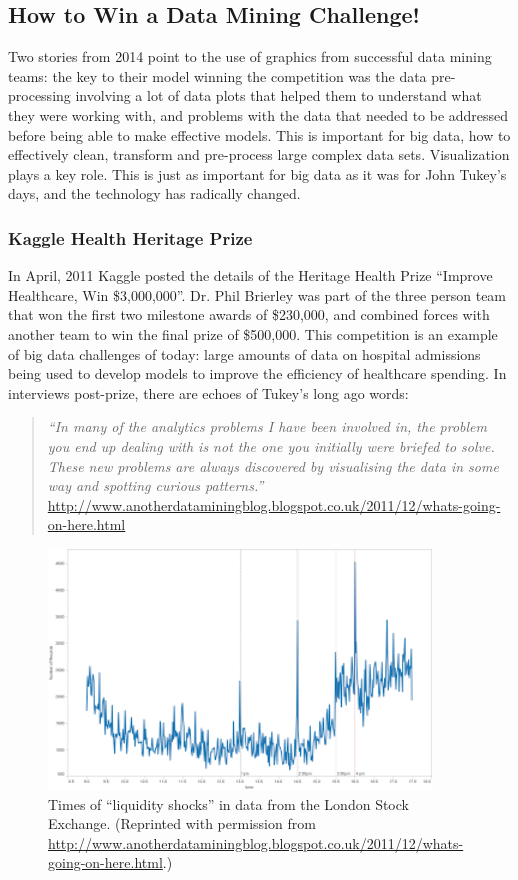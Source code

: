 \documentclass{article}
\begin{document}
\subsection{How to Win a Data Mining Challenge!}

Two stories from 2014 point to the use of graphics from successful data mining teams: the key to their model winning the competition was the data pre-processing involving a lot of data plots that helped them to understand what they were working with, and problems with the data that needed to be addressed before being able to make effective models. This is important for big data, how to effectively clean, transform and pre-process large complex data sets. Visualization plays a key role. This is just as important for big data as it was for John Tukey's days, and the technology has radically changed.

\subsubsection{Kaggle Health Heritage Prize}

In April, 2011 Kaggle posted the details of the Heritage Health Prize ``Improve Healthcare, Win \$3,000,000''.  Dr. Phil Brierley was part of the three person team that won the first two milestone awards of \$230,000, and combined forces with another team to win the final prize of \$500,000. This competition is an example of big data challenges of today: large amounts of data on hospital admissions being used to develop models to improve the efficiency of healthcare spending. In interviews post-prize, there are echoes of Tukey's long ago words:

\begin{quote}
{\em ``In many of the analytics problems I have been involved in, the problem you end up dealing with is not the one you initially were briefed to solve.
These new problems are always discovered by visualising the data in some way and spotting curious patterns.'' }\url{http://www.anotherdataminingblog.blogspot.co.uk/2011/12/whats-going-on-here.html}
\end{quote}

\begin{figure}[htp]
\centerline{\includegraphics[width=4in]{images/shockeventtimings.png}}
\caption{Times of ``liquidity shocks'' in data from the London Stock Exchange. (Reprinted with permission from \url{http://www.anotherdataminingblog.blogspot.co.uk/2011/12/whats-going-on-here.html}.)}
\label{liqshock}
\end{figure}
\end{document}
